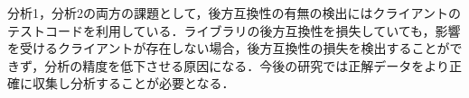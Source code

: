 \documentclass[submit]{ipsj}
\begin{document}
{%

分析1，分析2の両方の課題として，後方互換性の有無の検出にはクライアントのテストコードを利用している．ライブラリの後方互換性を損失していても，影響を受けるクライアントが存在しない場合，後方互換性の損失を検出することができず，分析の精度を低下させる原因になる．今後の研究では正解データをより正確に収集し分析することが必要となる．


}
\end{document}
